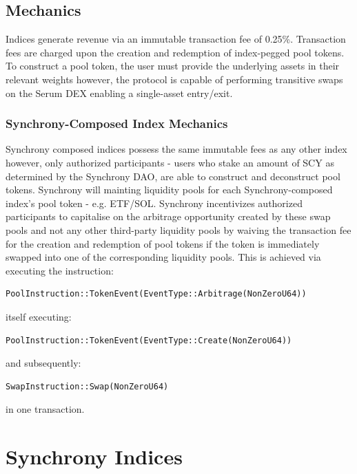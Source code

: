 \documentclass[10pt]{article}
\begin{document}
					\subsection{Mechanics}
					Indices generate revenue via an immutable transaction fee of 0.25\%. Transaction
					fees are charged upon the creation and redemption of index-pegged pool
					tokens.
					To construct a pool token, the user must provide the underlying assets in their
					relevant weights however, the protocol is capable of performing transitive swaps
					on the Serum DEX enabling a single-asset entry/exit.

					\subsubsection{Synchrony-Composed Index Mechanics}
					Synchrony composed indices possess the same immutable fees as any other index
					however, only authorized participants - users who stake an amount of SCY as
					determined by the Synchrony DAO, are able to construct and deconstruct pool
					tokens.
					Synchrony will mainting liquidity pools for each Synchrony-composed index's
					pool token - e.g. ETF/SOL. Synchrony incentivizes authorized participants to
					capitalise on the arbitrage opportunity created by these swap pools and not any
					other third-party liquidity pools by waiving the transaction fee for the creation and redemption of pool tokens
					if the token is immediately swapped into one of the corresponding liquidity
					pools. This is achieved via executing the instruction:
					\begin{verbatim}PoolInstruction::TokenEvent(EventType::Arbitrage(NonZeroU64))\end{verbatim} 
					itself executing:
					\begin{verbatim}PoolInstruction::TokenEvent(EventType::Create(NonZeroU64))\end{verbatim} and
					subsequently: \begin{verbatim}SwapInstruction::Swap(NonZeroU64)\end{verbatim} in one transaction.

					\section{Synchrony Indices}
\end{document}
